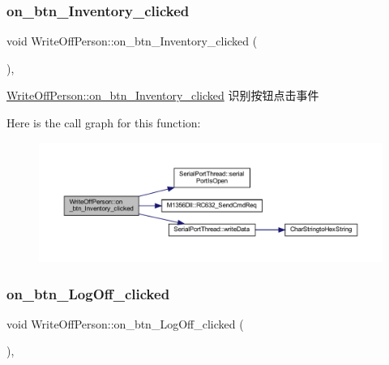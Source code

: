 \subsubsection{\texorpdfstring{on\_btn\_Inventory\_clicked}{on\_btn\_Inventory\_clicked}}
{\footnotesize\ttfamily void Write\+Off\+Person\+::on\+\_\+btn\+\_\+\+Inventory\+\_\+clicked (\begin{DoxyParamCaption}{ }\end{DoxyParamCaption})\hspace{0.3cm}{\ttfamily [private]}, {\ttfamily [slot]}}



\mbox{\hyperlink{class_write_off_person_a46c1284c1eb58a77b86218af80712c74}{Write\+Off\+Person\+::on\+\_\+btn\+\_\+\+Inventory\+\_\+clicked}} 识别按钮点击事件 

Here is the call graph for this function\+:
\nopagebreak
\begin{figure}[H]
\begin{center}
\leavevmode
\includegraphics[width=350pt]{class_write_off_person_a46c1284c1eb58a77b86218af80712c74_cgraph}
\end{center}
\end{figure}
\mbox{\label{class_write_off_person_a4ac5c022a769acb97dfb615a2fceb1f3}} 
\subsubsection{\texorpdfstring{on\_btn\_LogOff\_clicked}{on\_btn\_LogOff\_clicked}}
{\footnotesize\ttfamily void Write\+Off\+Person\+::on\+\_\+btn\+\_\+\+Log\+Off\+\_\+clicked (\begin{DoxyParamCaption}{ }\end{DoxyParamCaption})\hspace{0.3cm}{\ttfamily [private]}, {\ttfamily [slot]}}



